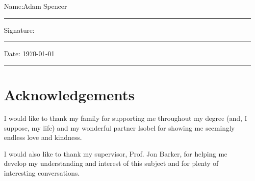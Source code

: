 \documentclass[11pt,oneside]{book}
\begin{document}
\noindent Name:\quad Adam Spencer\\[1mm]
\rule[1em]{25em}{0.5pt}

\noindent Signature:\\[1mm]
\rule[1em]{25em}{0.5pt}

\noindent Date: \quad \today\\[1mm]
\rule[1em]{25em}{0.5pt}




\newpage
\chapter{Acknowledgements}
I would like to thank my family for supporting me throughout my degree (and, I suppose, my life) and my wonderful partner Isobel for showing me seemingly endless love and kindness.

I would also like to thank my supervisor, Prof. Jon Barker, for helping me develop my understanding and interest of this subject and for plenty of interesting conversations.


\tableofcontents
\listoffigures
\listoftables


\mainmatter









 
 

\begin{appendices}








\end{appendices}
\end{document}
